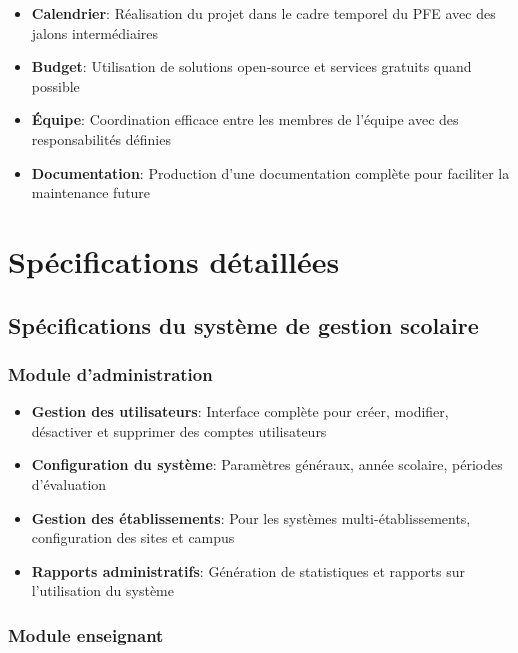 \begin{itemize}
  \item \textbf{Calendrier}: Réalisation du projet dans le cadre temporel du PFE avec des jalons intermédiaires
  
  \item \textbf{Budget}: Utilisation de solutions open-source et services gratuits quand possible
  
  \item \textbf{Équipe}: Coordination efficace entre les membres de l'équipe avec des responsabilités définies
  
  \item \textbf{Documentation}: Production d'une documentation complète pour faciliter la maintenance future
\end{itemize}

\section{Spécifications détaillées}

\subsection{Spécifications du système de gestion scolaire}

\subsubsection{Module d'administration}

\begin{itemize}
  \item \textbf{Gestion des utilisateurs}: Interface complète pour créer, modifier, désactiver et supprimer des comptes utilisateurs
  
  \item \textbf{Configuration du système}: Paramètres généraux, année scolaire, périodes d'évaluation
  
  \item \textbf{Gestion des établissements}: Pour les systèmes multi-établissements, configuration des sites et campus
  
  \item \textbf{Rapports administratifs}: Génération de statistiques et rapports sur l'utilisation du système
\end{itemize}

\subsubsection{Module enseignant}

